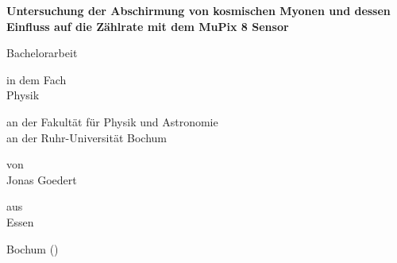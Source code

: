 \begin{center}

\begin{LARGE}
\textbf{Untersuchung der Abschirmung von kosmischen Myonen und dessen Einfluss auf die Zählrate mit dem MuPix 8 Sensor  } \\ 
\end{LARGE}

\vspace{40mm}

\begin{Large}

Bachelorarbeit

\vspace{\baselineskip}

in dem Fach\\
Physik\\


\vspace{\baselineskip}

an der Fakultät für  Physik und Astronomie\\
an der Ruhr-Universität Bochum
\vspace{2\baselineskip}

von\\
Jonas Goedert\\
\vspace{\baselineskip}

aus\\
Essen
\vspace{2\baselineskip}

Bochum (\the\year{})

\end{Large}

\end{center} 